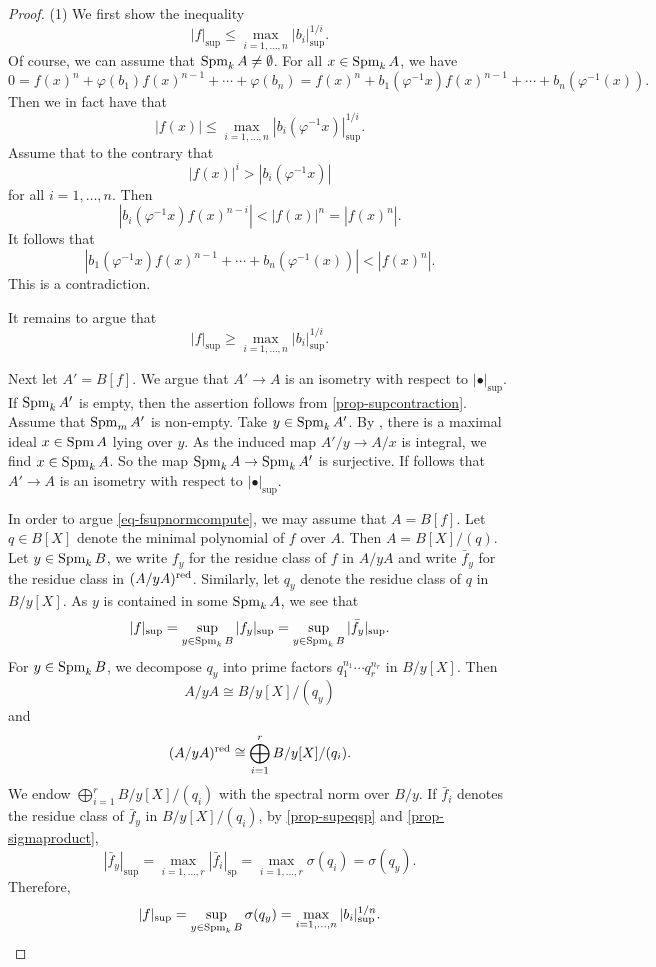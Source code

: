 \begin{proof}
    (1) We first show the inequality 
    \[
        |f|_{\sup}\leq \max_{i=1,\ldots,n} |b_i|_{\sup}^{1/i}.    
    \]
    Of course, we can assume that $\operatorname{Spm}_k A\neq \emptyset$.
    For all $x\in \operatorname{Spm}_k A$, we have
    \[
        0=f(x)^n +\varphi(b_1)f(x)^{n-1}+\cdots+\varphi(b_n)=f(x)^n+b_1(\varphi^{-1}x)f(x)^{n-1}+\cdots+b_n(\varphi^{-1}(x)).
    \]
    Then we in fact have that
    \[
        |f(x)|\leq   \max_{i=1,\ldots,n} |b_i(\varphi^{-1}x)|_{\sup}^{1/i}.  
    \]
    Assume that to the contrary that 
    \[
      |f(x)|^i> |b_i(\varphi^{-1}x)|  
    \]
    for all $i=1,\ldots,n$. Then
    \[
        |b_i(\varphi^{-1}x)f(x)^{n-i}|<|f(x)|^n=|f(x)^n|.  
    \]
    It follows that 
    \[
        |b_1(\varphi^{-1}x)f(x)^{n-1}+\cdots+b_n(\varphi^{-1}(x)) |< |f(x)^n|.
    \]
    This is a contradiction.

    It remains to argue that 
    \begin{equation}\label{eq-fsupnormcompute}
        |f|_{\sup}\geq\max_{i=1,\ldots,n} |b_i|_{\sup}^{1/i}.    
    \end{equation}
    
    Next let $A'=B[f]$. We argue that $A'\rightarrow A$ is an isometry with respect to $|\bullet|_{\sup}$. If $\operatorname{Spm}_k A'$ is empty, then the assertion follows from \cref{prop-supcontraction}. Assume  that $\operatorname{Spm}_m A'$ is non-empty. Take $y\in \operatorname{Spm}_k A'$. By \cite[\href{https://stacks.math.columbia.edu/tag/00GQ}{Tag 00GQ}]{stacks-project}, there is a maximal ideal $x\in \operatorname{Spm} A$ lying over $y$. As the induced map $A'/y\rightarrow A/x$ is integral, we find $x\in \operatorname{Spm}_k A$. So the map $\operatorname{Spm}_k A\rightarrow \operatorname{Spm}_k A'$ is surjective. If follows that $A'\rightarrow A$ is an isometry with respect to $|\bullet|_{\sup}$.

    In order to argue \eqref{eq-fsupnormcompute}, we may assume that $A=B[f]$. Let $q\in B[X]$ denote the minimal polynomial of $f$ over $A$. Then $A=B[X]/(q)$. Let $y\in \operatorname{Spm}_k B$, we write $f_y$ for the residue class of $f$ in $A/yA$ and write $\bar{f}_y$ for the residue class in $(A/yA)^{\operatorname{red}}$. Similarly, let $q_y$ denote the residue class of $q$ in $B/y[X]$. As $y$ is contained in some $\operatorname{Spm}_k A$, we see that
    \[
        |f|_{\sup}=\sup_{y\in \operatorname{Spm}_k B} |f_y|_{\sup}=\sup_{y\in \operatorname{Spm}_k B} |\bar{f}_y|_{\sup}.  
    \]
    For $y\in \operatorname{Spm}_k B$, we decompose $q_y$ into prime factors $q_1^{n_1}\cdots q_r^{n_r}$ in $B/y[X]$. Then
    \[
        A/yA\cong B/y[X]/(q_y)  
    \]
    and
    \[
        (A/yA)^{\operatorname{red}}\cong \bigoplus_{i=1}^r B/y[X]/(q_i).
    \]
    We endow $\bigoplus_{i=1}^r B/y[X]/(q_i)$ with the spectral norm over $B/y$. If $\bar{f}_i$ denotes the residue class of $\bar{f}_y$ in $B/y[X]/(q_i)$, by \cref{prop-supeqsp} and \cref{prop-sigmaproduct},
    \[
        |\bar{f}_y|_{\sup}=\max_{i=1,\ldots,r} |\bar{f}_i|_{\mathrm{sp}} = \max_{i=1,\ldots,r} \sigma(q_i)=\sigma(q_y).   
    \]
    Therefore, 
    \[
      |f|_{\sup}=\sup_{y\in \operatorname{Spm}_k B}\sigma(q_y)=\max_{i=1,\ldots,n} |b_i|_{\sup}^{1/n}.  
    \]


\end{proof}
